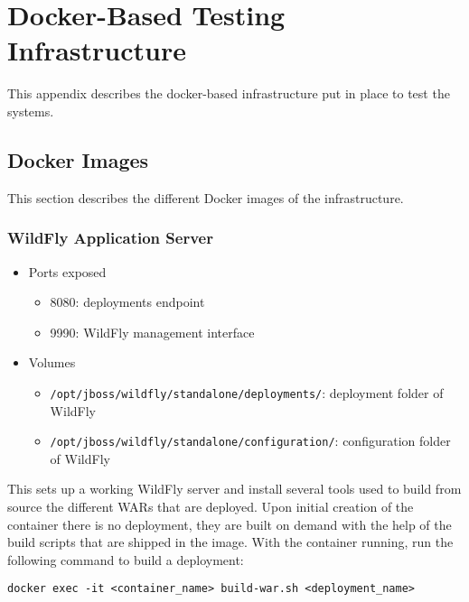 \chapter{Docker-Based Testing Infrastructure}

This appendix describes the docker-based infrastructure put in place to test the systems.

\section{Docker Images}
\label{sec:docker-images}

This section describes the different Docker images of the infrastructure.

\subsection{WildFly Application Server}

\begin{itemize}
    \item Ports exposed
        \begin{itemize}
        \item 8080: deployments endpoint
        \item 9990: WildFly management interface
        \end{itemize}
        
    \item Volumes
        \begin{itemize}
        \item \verb|/opt/jboss/wildfly/standalone/deployments/|: deployment folder of WildFly
        \item \verb|/opt/jboss/wildfly/standalone/configuration/|: configuration folder of WildFly
        \end{itemize}
\end{itemize}

This sets up a working WildFly server and install several tools used to build from source the different WARs that are deployed.
Upon initial creation of the container there is no deployment, they are built on demand with the help of the build scripts that are shipped in the image.
With the container running, run the following command to build a deployment: 

\begin{verbatim}
docker exec -it <container_name> build-war.sh <deployment_name>
\end{verbatim}


